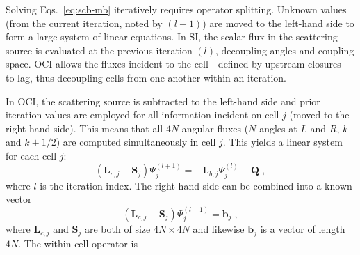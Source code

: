 Solving Eqs.~\eqref{eq:scb-mb} iteratively requires operator splitting.
Unknown values (from the current iteration, noted by $(l+1)$) are moved to the left-hand side to form a large system of linear equations.
In SI, the scalar flux in the scattering source is evaluated at the previous iteration $(l)$, decoupling angles and coupling space.
OCI allows the fluxes incident to the cell---defined by upstream closures---to lag, thus decoupling cells from one another within an iteration.

In OCI, the scattering source is subtracted to the left-hand side and  prior iteration values are employed for all information incident on cell $j$ (moved to the right-hand side).
This means that all $4N$ angular fluxes ($N$ angles at $L$ and $R$, $k$ and $k+1/2$) are computed simultaneously in cell $j$.
This yields a linear system for each cell $j$:
\begin{equation}
    \label{eq:oci}
    \left( \bm{L}_{c,j} - \bm{S}_j \right) \Psi_j^{(l+1)} = -\textbf{L}_{b,j} \Psi_j^{(l)} + \textbf{Q} \;, 
\end{equation}
where $l$ is the iteration index.
The right-hand side can be combined into a known vector
\begin{equation}
     \left( \bm{L}_{c,j} - \bm{S}_j \right) \Psi_j^{(l+1)}  = \bm{b}_j \; ,
\end{equation}
where $\bm{L}_{c,j}$ and $\bm{S}_j$ are both of size $4N\times4N$ and likewise $\bm{b}_j$ is a vector of length $4N$.
\newcommand{\lcmj}[1]{\begin{bmatrix} \bm{L}_{c,j,#1} \end{bmatrix} }
\newcommand{\zeros}{\begin{bmatrix} 0 \end{bmatrix} }
The within-cell operator is
